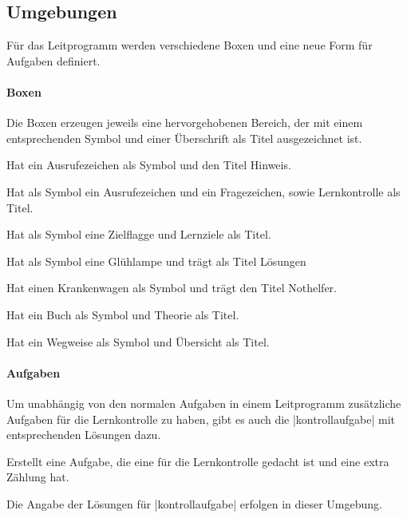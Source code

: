 \subsection{Umgebungen}
Für das Leitprogramm werden verschiedene Boxen und eine neue Form für Aufgaben definiert.

\paragraph{Boxen}
Die Boxen erzeugen jeweils eine hervorgehobenen Bereich, der mit einem entsprechenden Symbol und einer Überschrift als Titel ausgezeichnet ist.
\begin{environments}
     Hat ein Ausrufezeichen als Symbol und den Titel Hinweis.

     Hat als Symbol  ein Ausrufezeichen und ein Fragezeichen, sowie Lernkontrolle als Titel. 

     Hat als Symbol eine Zielflagge und Lernziele als Titel. 

     Hat als Symbol eine Glühlampe und trägt als Titel Lösungen 

     Hat einen Krankenwagen als Symbol und trägt den Titel Nothelfer. 

     Hat ein Buch als Symbol und Theorie als Titel. 

     Hat ein Wegweise als Symbol und  Übersicht als Titel.
\end{environments}

\paragraph{Aufgaben}
Um unabhängig von den normalen Aufgaben in einem Leitprogramm zusätzliche Aufgaben für die Lernkontrolle zu haben, gibt es auch die \verbcode|kontrollaufgabe| mit entsprechenden Lösungen dazu.
\begin{environments}
     Erstellt eine Aufgabe, die eine für die Lernkontrolle gedacht ist und eine extra Zählung hat.

     Die Angabe der Lösungen für \verbcode|kontrollaufgabe| erfolgen in dieser Umgebung.
\end{environments}
